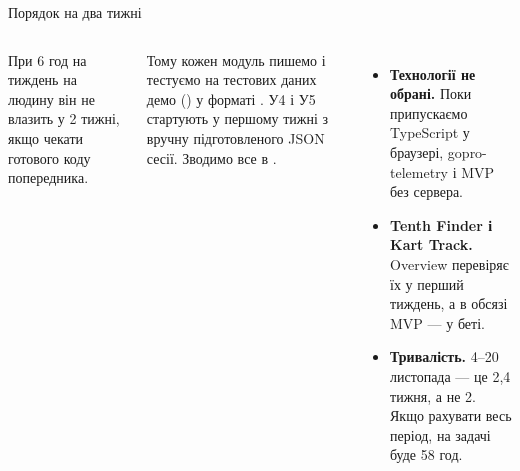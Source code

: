 \begin{frame}{Порядок на два тижні}
\vspace{0.2cm}
\raggedright
\begin{columns}[T,onlytextwidth]
  \par\vskip0.12cm
  {\tiny\color{body}При 6 год на тиждень на людину він не влазить у 2 тижні, якщо чекати готового коду попередника.\par\vskip0.1cm
  Тому кожен модуль пишемо і тестуємо на тестових даних демо () у форматі . У4 і У5 стартують у першому тижні з вручну підготовленого JSON сесії. Зводимо все в .\par}
  \par\vskip0.12cm
  {\tiny\color{body}
  \begin{itemize}\setlength{\itemsep}{0.06cm}
    \item \textbf{Технології не обрані.} Поки припускаємо TypeScript у браузері, gopro-telemetry і MVP без сервера.
    \item \textbf{Tenth Finder і Kart Track.} Overview перевіряє їх у перший тиждень, а в обсязі MVP  — у беті.
    \item \textbf{Тривалість.} 4–20 листопада — це 2,4 тижня, а не 2. Якщо рахувати весь період, на задачі буде 58 год.
  \end{itemize}}
\end{columns}
\end{frame}

